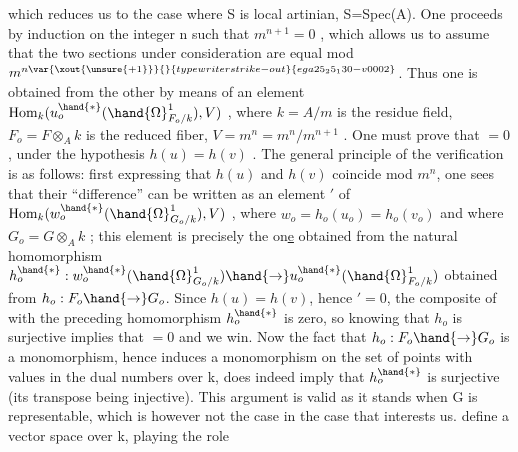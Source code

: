 
which reduces us to the case where S is local artinian, S=Spec(A). One proceeds
by induction on the integer n such that $m^{n+1}=0$ , which allows us to
assume that the two sections under consideration  are equal mod $m^{n\var{\xout{\unsure{+1}}}{}{typewriter strike-out}{ega25_25_130-v0002}}$. Thus
one is obtained from the other by means of an element  
$\mathrm{Hom}_k(u_o^{\hand{*}}(\hand{\Omega}^1_{F_o/k}), V)$ , where $k=A/m$ is the residue field, $F_o=F\otimes_A k$ is the
reduced fiber, $V=m^n = m^n/m^{n+1}$ . One must prove that \hand{$\delta$}$= 0$, under
the hypothesis $h(u)=h(v)$ . The general principle of the verification is as
follows: first expressing that $h(u)$ and $h(v)$ coincide mod $m^n$, one sees
that their ``difference'' can be written as an element \hand{$\delta$}$'$ of
$\mathrm{Hom}_k(w_o^{\hand{*}}(\hand{\Omega}^1_{G_o/k}),V)$ , where $w_o = h_o(u_o)=h_o(v_o)$  and where $G_o = G\otimes_A k$ ;
this element is precisely the on\uline{e} obtained from  the natural
homomorphism $h_o^{\hand{*}} : w_o^{\hand{*}}(\hand{\Omega}^1_{G_o/k}) \hand{\to} u_o^{\hand{*}}(\hand{\Omega}^1_{F_o/k})$ obtained from $h_o: F_o\hand{\to} G_o$. Since
$h(u)=h(v)$, hence \hand{$\delta$}$' = 0$, the composite of \hand{$\delta$} with the preceding homomorphism
$h_o^{\hand{*}}$ is zero, so knowing that $h_o$ is surjective implies that \hand{$\delta$}$=0$
and we win. Now the fact that $h_o:F_o\hand{\to} G_o$ is a monomorphism, hence induces
a monomorphism on the set of points with values in the dual
numbers over k, does indeed imply that $h_o^{\hand{*}}$ is surjective (its transpose
being injective). This argument is valid as it stands when G
is representable, which is however not the case in the case that
interests us.   define a vector space   over k, playing the role
